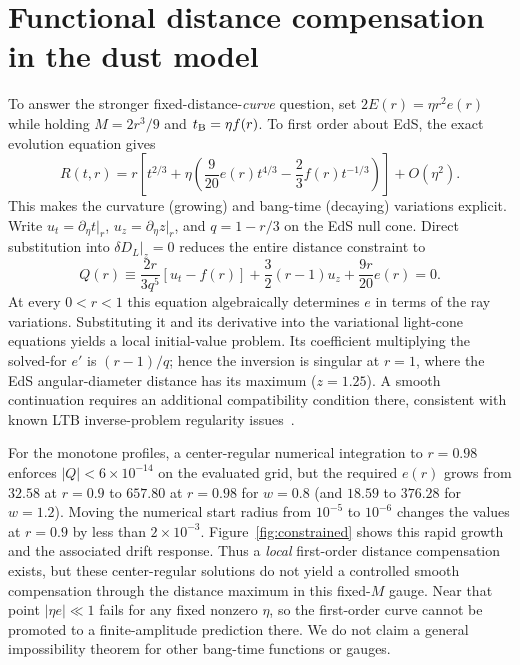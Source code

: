 \documentclass[11pt]{article}
\newcommand{\tb}{t_{\rm B}}
\begin{document}
\section{Functional distance compensation in the dust model}
To answer the stronger fixed-distance-\emph{curve} question, set $2E(r)=\eta r^2e(r)$ while holding $M=2r^3/9$ and $\tb=\eta f(r)$. To first order about EdS, the exact evolution equation gives
\begin{equation}
R(t,r)=r\left[t^{2/3}+\eta\left(\frac9{20}e(r)t^{4/3}-\frac23 f(r)t^{-1/3}\right)\right]+O(\eta^2).\label{eq:growing}
\end{equation}
This makes the curvature (growing) and bang-time (decaying) variations explicit. Write $u_t=\partial_\eta t|_r$, $u_z=\partial_\eta z|_r$, and $q=1-r/3$ on the EdS null cone. Direct substitution into $\delta D_L|_z=0$ reduces the entire distance constraint to
\begin{equation}
Q(r)\equiv\frac{2r}{3q^5}[u_t-f(r)]+\frac32(r-1)u_z+\frac{9r}{20}e(r)=0.\label{eq:Q}
\end{equation}
At every $0<r<1$ this equation algebraically determines $e$ in terms of the ray variations. Substituting it and its derivative into the variational light-cone equations yields a local initial-value problem. Its coefficient multiplying the solved-for $e'$ is $(r-1)/q$; hence the inversion is singular at $r=1$, where the EdS angular-diameter distance has its maximum ($z=1.25$). A smooth continuation requires an additional compatibility condition there, consistent with known LTB inverse-problem regularity issues~\cite{inverse}.

For the monotone profiles, a center-regular numerical integration to $r=0.98$ enforces $|Q|<6\times10^{-14}$ on the evaluated grid, but the required $e(r)$ grows from $32.58$ at $r=0.9$ to $657.80$ at $r=0.98$ for $w=0.8$ (and $18.59$ to $376.28$ for $w=1.2$). Moving the numerical start radius from $10^{-5}$ to $10^{-6}$ changes the values at $r=0.9$ by less than $2\times10^{-3}$. Figure~\ref{fig:constrained} shows this rapid growth and the associated drift response. Thus a \emph{local} first-order distance compensation exists, but these center-regular solutions do not yield a controlled smooth compensation through the distance maximum in this fixed-$M$ gauge. Near that point $|\eta e|\ll1$ fails for any fixed nonzero $\eta$, so the first-order curve cannot be promoted to a finite-amplitude prediction there. We do not claim a general impossibility theorem for other bang-time functions or gauges.
\end{document}
